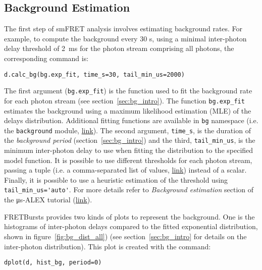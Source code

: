 \subsection{Background Estimation}
\label{sec:bg_calc}

The first step of smFRET analysis involves estimating background rates.
For example, to compute the background every 30 s, using a minimal inter-photon
delay threshold of 2~ms for the photon stream comprising all photons, the corresponding command is:

\begin{lstlisting}
d.calc_bg(bg.exp_fit, time_s=30, tail_min_us=2000)
\end{lstlisting}

The first argument (\verb|bg.exp_fit|) is the function used to fit the
background rate for each photon stream (see section~\ref{sec:bg_intro}).
The function
\verb|bg.exp_fit| estimates the background using a maximum likelihood estimation
(MLE) of the delays distribution.
Additional fitting functions are available in
\verb|bg| namespace 
(i.e. the \verb|background| module, \href{http://fretbursts.readthedocs.org/en/latest/background.html}
{link}). The second argument, \verb|time_s|, is the duration of the
\textit{background period} (section~\ref{sec:bg_intro}) and the third, \verb|tail_min_us|,
is the minimum inter-photon delay to use when fitting the distribution to the specified model function.
It is possible to use different thresholds for each photon stream, passing a
tuple (i.e. a comma-separated list of values, \href{https://docs.python.org/3.5/tutorial/datastructures.html#tuples-and-sequences}{link}) instead of a scalar.
Finally, it is possible to use a heuristic estimation of the threshold using
\verb|tail_min_us='auto'|. For more details refer to \textit{Background estimation} 
section of the μs-ALEX tutorial 
(\href{http://nbviewer.jupyter.org/github/tritemio/FRETBursts_notebooks/blob/master/notebooks/FRETBursts%20-%20us-ALEX%20smFRET%20burst%20analysis.ipynb#Background-estimation}{link}).

FRETBursts provides two kinds of plots to represent the background. One is the histograms
of inter-photon delays compared to the fitted exponential distribution, shown in 
figure~\ref{fig:bg_dist_all}) (see section~\ref{sec:bg_intro} for details on the inter-photon distribution). 
This plot is created with the command:

\begin{lstlisting}
dplot(d, hist_bg, period=0)
\end{lstlisting}

